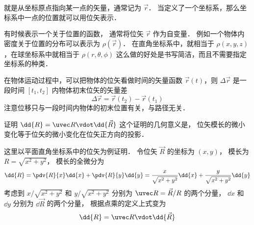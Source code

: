 
就是从坐标原点指向某一点的矢量，通常记为 $\vec r$． 当定义了一个坐标系，那么坐标系中一点的位置就可以用位矢表示．

有时候表示一个关于位置的函数， 通常将位矢 $\vec r$ 作为自变量． 例如一个物体内密度关于位置的分布可以表示为 $\rho(\vec r)$． 在直角坐标系中，就相当于 $\rho(x,y,z)$，在球坐标系中就相当于 $\rho(r,\theta,\phi)$ 这么做的好处是书写简洁，而且不需要指定坐标系的种类．

在物体运动过程中，可以把物体的位矢看做时间的矢量函数 $\vec r(t)$，则 $\Delta \vec r$ 是一段时间 $[t_1,t_2]$ 内物体初末位矢的矢量差
\begin{equation}
\Delta \vec r = \vec r(t_2) - \vec r(t_1)
\end{equation}
注意位移只与一段时间内物体的初末位置有关，与路径无关．

\begin{exam}{证明 $\dd{R} = \uvec R \vdot \dd{\vec R}$}\label{Disp_ex1}
这个证明的几何意义是， 位矢模长的微小变化等于位矢的微小变化在位矢正方向的投影．

这里以平面直角坐标系中的位矢为例证明． 令位矢 $\vec R$ 的坐标为 $(x, y)$， 模长为 $R = \sqrt{x^2 + y^2}$，
模长的全微分为
\begin{equation}
\dd{R} = \pdv{R}{x} \dd{x} + \pdv{R}{y} \dd{y} = \frac{x}{\sqrt{x^2 + y^2}} \dd{x} + \frac{y}{\sqrt{x^2 + y^2}} \dd{y}
\end{equation}
考虑到 $x/\sqrt{x^2 + y^2}$ 和 $y/\sqrt{x^2 + y^2}$ 分别为 $\uvec R = \vec R/R$ 的两个分量， $\dd{x}$ 和 $\dd{y}$ 分别为 $\dd{\vec R}$ 的两个分量， 根据点乘的定义上式变为
\begin{equation}
\dd{R} = \uvec R \vdot \dd{\vec R}
\end{equation}
\end{exam}


